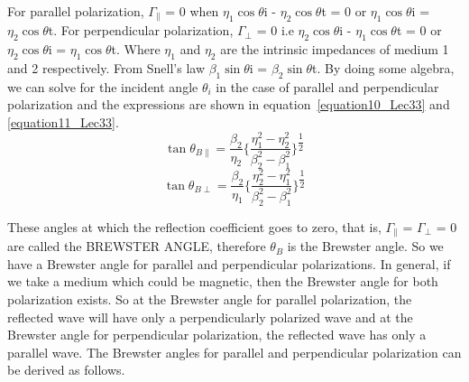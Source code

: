 For parallel polarization, $\Gamma_\parallel$ = 0 when $\eta_1\cos\theta$i - $\eta_2\cos\theta$t = 0 or $\eta_1\cos\theta$i = $\eta_2\cos\theta$t. For perpendicular polarization, $\Gamma_\perp$ = 0 i.e $\eta_2\cos\theta$i - $\eta_1\cos\theta$t = 0 or $\eta_2\cos\theta$i = $\eta_1\cos\theta$t. Where $\eta_1$ and $\eta_2$ are the intrinsic impedances of medium 1 and 2 respectively. From Snell's law $\beta_1\sin\theta$i = $\beta_2\sin\theta$t. By doing some algebra, we can solve for the incident angle $\theta_i$ in the case of parallel and perpendicular polarization and the expressions are shown in equation~\ref{equation10_Lec33} and \ref{equation11_Lec33}. 
\begin{equation}
\tan\theta_{B\parallel} = \dfrac{\beta_2}{\eta_2} \Bigg\{ \dfrac{\eta_1 ^2 - \eta_2 ^2}{\beta_2 ^2 - \beta_1 ^2} \Bigg\}^{\dfrac{1}{2}}
\label{equation10_Lec33}
\end{equation}
\begin{equation}
\tan\theta_{B\perp} = \dfrac{\beta_2}{\eta_1} \Bigg\{ \dfrac{\eta_2 ^2 - \eta_1 ^2}{\beta_2 ^2 - \beta_1 ^2} \Bigg\}^{\dfrac{1}{2}}
\label{equation11_Lec33}
\end{equation}

These angles at which the reflection coefficient goes to zero, that is, $\Gamma_\parallel$ = $\Gamma_\perp$ = 0 are called the BREWSTER ANGLE, therefore $\theta_B$ is the Brewster angle. So we have a Brewster angle for parallel and perpendicular polarizations. In general, if we take a medium which could be magnetic, then the Brewster angle for both polarization exists. So at the Brewster angle for parallel polarization, the reflected wave will have only a perpendicularly polarized wave and at the Brewster angle for perpendicular polarization, the reflected wave has only a parallel wave. The Brewster angles for parallel and perpendicular polarization can be derived as follows.

